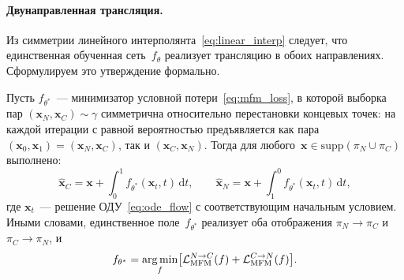 \paragraph{Двунаправленная трансляция.}
Из симметрии линейного интерполянта~\eqref{eq:linear_interp} следует, что единственная обученная сеть~$f_\theta$ реализует трансляцию в обоих направлениях. Сформулируем это утверждение формально.

\begin{proposition}
\label{prop:bidir}
Пусть $f_{\theta^*}$~--- минимизатор условной потери~\eqref{eq:mfm_loss}, в которой выборка пар $(\mathbf{x}_N,\mathbf{x}_C)\sim\gamma$ симметрична относительно перестановки концевых точек: на каждой итерации с равной вероятностью предъявляется как пара $(\mathbf{x}_0,\mathbf{x}_1)=(\mathbf{x}_N,\mathbf{x}_C)$, так и $(\mathbf{x}_C,\mathbf{x}_N)$. Тогда для любого~$\mathbf{x}\in\mathrm{supp}(\pi_N\cup\pi_C)$ выполнено:
\begin{equation}
    \hat{\mathbf{x}}_C = \mathbf{x} + \int_0^1 f_{\theta^*}(\mathbf{x}_t, t)\,\mathrm{d}t, \qquad
    \hat{\mathbf{x}}_N = \mathbf{x} + \int_1^0 f_{\theta^*}(\mathbf{x}_t, t)\,\mathrm{d}t,
    \label{eq:bidir}
\end{equation}
где $\mathbf{x}_t$~--- решение ОДУ~\eqref{eq:ode_flow} с соответствующим начальным условием. Иными словами, единственное поле~$f_{\theta^*}$ реализует оба отображения $\pi_N\to\pi_C$ и $\pi_C\to\pi_N$, и
\begin{equation}
    f_{\theta^*} = \operatorname*{arg\,min}_{f}\bigl[\mathcal{L}_{\mathrm{MFM}}^{N\to C}(f) + \mathcal{L}_{\mathrm{MFM}}^{C\to N}(f)\bigr].
    \label{eq:bidir_obj}
\end{equation}
\end{proposition}

